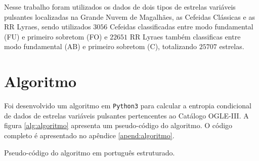 Nesse trabalho foram utilizados os dados de dois tipos de estrelas variáveis pulsantes localizadas na Grande Nuvem de Magalhães, as Cefeidas Clássicas e as RR Lyraes, sendo utilizados $3056$ Cefeidas classificadas entre modo fundamental (FU) e primeiro sobretom (FO) e $22651$ RR Lyraes também classificas entre modo fundamental (AB) e primeiro sobretom (C), totalizando $25707$ estrelas.




\section{Algoritmo}

Foi desenvolvido um algoritmo em \texttt{Python3} para calcular a entropia condicional de dados de estrelas variáveis pulsantes  pertencentes ao Catálogo OGLE-III. A figura \ref{alg:algoritmo} apresenta um pseudo-código do algoritmo. O código completo é apresentado no apêndice \ref{apend:algoritmo}. %

\begin{algorithm}[!h]
\SetAlgoLined
\Entrada{Tempo e Magnitude \\
\Saida{Período $P$ que minimiza a entropia}
\Inicio{
Leitura dos dados de entrada como vetores; \\
Cria um vetor com $n$ períodos sendo P = ($p_1$ , $p_2$, $\cdots$, $p_n$); \\
Normalização da magnitude;\\
\ParaCada{$p_i$ em $P$}{
Transformar o tempo para o espaço de fase; \\
Faz as repartições e contabiliza os pontos; \\
Calcula a entropia de Shannon condicional; \\
Armazena a entropia calculada para o período $p_i$
}
Achar o valor mínimo de entropia: $E_{min}$ = min(Entropia) \\
Achar o período que minimiza a entropia:
$P_{E_{min}}$=P[min(entropia)]
}
\Retorna{$P_{E_{min}}$}
}
\caption[Pseudo-código do algoritmo.]{Pseudo-código do algoritmo em português estruturado.}
\label{alg:algoritmo}
\end{algorithm}

